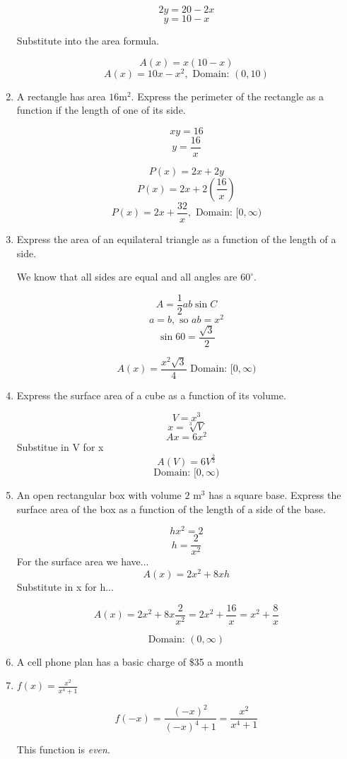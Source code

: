 \documentclass{article}
\begin{document}
\begin{enumerate}
		$$2y = 20 - 2x$$
		$$y = 10 - x$$
		
		Substitute into the area formula.
		
		$$A(x) = x(10 - x)$$
		$$A(x) = 10x - x^2, \text{ Domain: } (0, 10)$$
		
	\item A rectangle has area $16 \text{m}^2$. Express the perimeter of the rectangle as a
		function if the length of one of its side.
		
		$$xy = 16$$
		$$y = \frac{16}{x}$$
		
		$$P(x) = 2x + 2y$$
		$$P(x) = 2x + 2(\frac{16}{x})$$
		$$P(x) = 2x + \frac{32}{x}, \text{ Domain: } [0, \infty)$$
		
	\item Express the area of an equilateral triangle as a function of the length of a side.
	
		We know that all sides are equal and all angles are $60^{\circ}$.

		$$A = \frac{1}{2}ab\sin C$$
		$$ a = b, \text{ so } ab = x^2 $$
		$$\sin 60 = \frac{\sqrt{3}}{2}$$

		$$ A(x) = \frac{x^2\sqrt{3}}{4} \text{ Domain: } [0, \infty)$$

	\item Express the surface area of a cube as a function of its volume.

		$$V = x^3$$
		$$x = \sqrt[3]{V}$$
		$$A{x} = 6 x^2$$
		Substitue in V for x
		$$A(V) = 6 V^{\frac{2}{3}}$$
		$$\text{Domain: } [0, \infty)$$

	\item An open rectangular box with volume $2 \text{ m}^3$ has a square base.
		Express the surface area of the box as a function of the length of a side of the base.

		$$hx^2 = 2$$
		$$h = \frac{2}{x^2}$$
		For the surface area we have...
		$$A(x) = 2x^2 + 8xh$$
		Substitute in x for h...
	
		$$A(x) = 2x^2 + 8x\frac{2}{x^2} = 2x^2 + \frac{16}{x} = x^2 + \frac{8}{x}$$

	 	$$\text{Domain: } (0, \infty)$$

	\item A cell phone plan has a basic charge of \$35 a month

	\item $f(x) = \frac{x^2}{x^4 + 1}$

		$$f(-x) = \frac{(-x)^2}{(-x)^4 + 1} = \frac{x^2}{x^4 + 1}$$

		This function is \emph{even}.


\end{enumerate}
\end{document}
